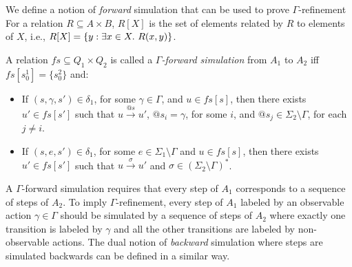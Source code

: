 We define a notion of \emph{forward} simulation that can be used to prove $\Gamma$-refinement %
For a relation $R\subseteq A\times B$, $R[X]$ is the set of elements related by $R$ to elements of $X$, i.e., $R[X]=\set{y:\exists x\in X.\ R(x,y)}$.

\vspace{-1.5mm}
\begin{definition}
A relation $\mathit{fs} \subseteq Q_{1} \times Q_{2}$ is called a \emph{$\Gamma$-forward simulation} from $A_1$ to $A_2$ if{f} $\mathit{fs}[s_0^1] = \{s_0^2 \}$ and:
\vspace{-1.5mm}
\begin{itemize}
\item If $(s,\gamma,s') \in \delta_1$, for some $\gamma\in \Gamma$, and $u \in \mathit{fs}[s]$, then there exists $u' \in \mathit{fs}[s']$ such that $u \xrightarrow{@s} u'$, $@s_i=\gamma$, for some $i$, and $@s_j\in \Sigma_2\setminus\Gamma$, for each $j\neq i$.
\item If $(s,e,s') \in \delta_1$, for some $e \in \Sigma_1\setminus \Gamma$ and $u \in \mathit{fs}[s]$, then there exists $u' \in \mathit{fs}[s']$ such that $u \xrightarrow{\sigma} u'$ and $\sigma\in (\Sigma_2\setminus\Gamma)^*$.  
\end{itemize}
\vspace{-3.5mm}
\end{definition}
A $\Gamma$-forward simulation requires that every step of $A_1$ corresponds to a sequence of steps of $A_2$. To imply $\Gamma$-refinement, every step of $A_1$ labeled by an observable action $\gamma\in \Gamma$ should be simulated by a sequence of steps of $A_2$ where exactly one transition is labeled by $\gamma$ and all the other transitions are labeled by non-observable actions.
The dual notion of \emph{backward} simulation where steps are simulated backwards can be defined in a similar way.




